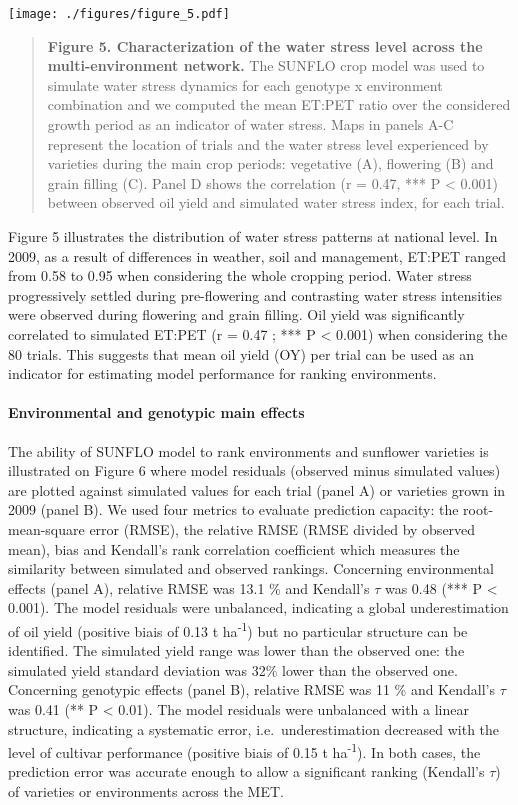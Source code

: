 \documentclass[a4paper]{article}
\let\oldparagraph\paragraph
\renewcommand{\paragraph}[1]{\oldparagraph{#1}\mbox{}}
\begin{document}
\texttt{[image: ./figures/figure\_5.pdf]}

\begin{quote}
\textbf{Figure 5. Characterization of the water stress level across the
multi-environment network.} The SUNFLO crop model was used to simulate
water stress dynamics for each genotype x environment combination and we
computed the mean ET:PET ratio over the considered growth period as an
indicator of water stress. Maps in panels A-C represent the location of
trials and the water stress level experienced by varieties during the
main crop periods: vegetative (A), flowering (B) and grain filling (C).
Panel D shows the correlation (r = 0.47, *** P \textless{} 0.001)
between observed oil yield and simulated water stress index, for each
trial.
\end{quote}

Figure 5 illustrates the distribution of water stress patterns at
national level. In 2009, as a result of differences in weather, soil and
management, ET:PET ranged from 0.58 to 0.95 when considering the whole
cropping period. Water stress progressively settled during pre-flowering
and contrasting water stress intensities were observed during flowering
and grain filling. Oil yield was significantly correlated to simulated
ET:PET (r = 0.47 ; *** P \textless{} 0.001) when considering the 80
trials. This suggests that mean oil yield (OY) per trial can be used as
an indicator for estimating model performance for ranking environments.

\paragraph{Environmental and genotypic main
effects}\label{environmental-and-genotypic-main-effects}

The ability of SUNFLO model to rank environments and sunflower varieties
is illustrated on Figure 6 where model residuals (observed minus
simulated values) are plotted against simulated values for each trial
(panel A) or varieties grown in 2009 (panel B). We used four metrics to
evaluate prediction capacity: the root-mean-square error (RMSE), the
relative RMSE (RMSE divided by observed mean), bias and Kendall's rank
correlation coefficient which measures the similarity between simulated
and observed rankings. Concerning environmental effects (panel A),
relative RMSE was 13.1 \% and Kendall's \(\tau\) was 0.48 (*** P
\textless{} 0.001). The model residuals were unbalanced, indicating a
global underestimation of oil yield (positive biais of 0.13 t
ha\textsuperscript{-1}) but no particular structure can be identified.
The simulated yield range was lower than the observed one: the simulated
yield standard deviation was 32\% lower than the observed one.
Concerning genotypic effects (panel B), relative RMSE was 11 \% and
Kendall's \(\tau\) was 0.41 (** P \textless{} 0.01). The model residuals
were unbalanced with a linear structure, indicating a systematic error,
i.e.~underestimation decreased with the level of cultivar performance
(positive biais of 0.15 t ha\textsuperscript{-1}). In both cases, the
prediction error was accurate enough to allow a significant ranking
(Kendall's \(\tau\)) of varieties or environments across the MET.
\end{document}
